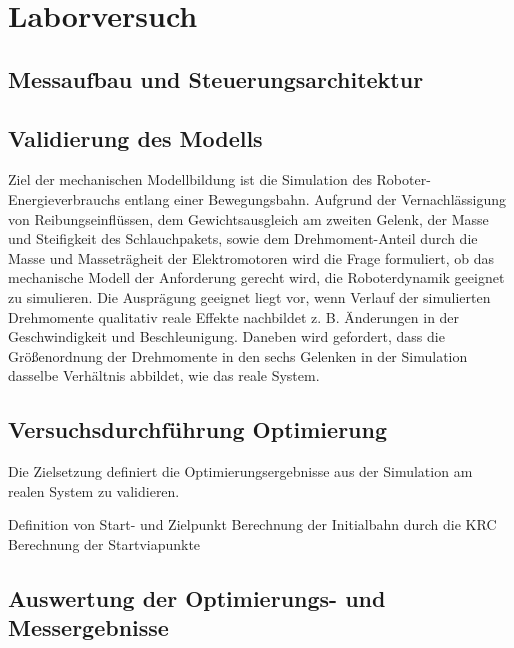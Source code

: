 \chapter{Laborversuch}
\section{Messaufbau und Steuerungsarchitektur}
\section{Validierung des Modells}

Ziel der  mechanischen Modellbildung ist die Simulation des Roboter-Energieverbrauchs entlang einer Bewegungsbahn. Aufgrund der Vernachlässigung von Reibungseinflüssen, dem Gewichtsausgleich am  zweiten Gelenk, der Masse und Steifigkeit des Schlauchpakets, sowie dem Drehmoment-Anteil durch die Masse und Masseträgheit der Elektromotoren  wird die Frage formuliert, ob das mechanische Modell der Anforderung gerecht wird, die Roboterdynamik geeignet zu simulieren. Die Ausprägung geeignet liegt vor, wenn Verlauf der simulierten Drehmomente qualitativ reale Effekte nachbildet z. B.  Änderungen in der Geschwindigkeit und Beschleunigung. Daneben wird gefordert, dass die Größenordnung der Drehmomente in den sechs  Gelenken in der Simulation dasselbe Verhältnis abbildet, wie das reale System.  

\section{Versuchsdurchführung Optimierung}
Die Zielsetzung definiert die Optimierungsergebnisse aus der Simulation am realen System zu validieren. 

Definition von Start- und Zielpunkt
Berechnung der Initialbahn durch die KRC
Berechnung der Startviapunkte

\section{Auswertung der Optimierungs- und Messergebnisse}